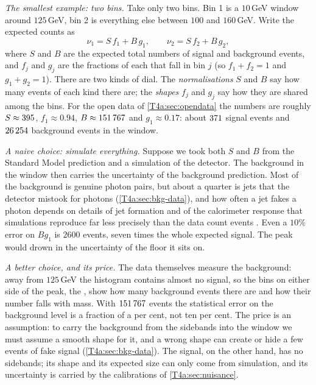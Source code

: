 \emph{The smallest example: two bins.} Take only two bins. Bin 1 is a $10$\,GeV window around $125$\,GeV, bin 2 is everything else between $100$ and $160$\,GeV. Write the expected counts as
\begin{equation}
  \nu_1=S\,f_1+B\,g_1,\qquad \nu_2=S\,f_2+B\,g_2,
  \label{T4a:eq:two-bin}
\end{equation}
where $S$ and $B$ are the expected total numbers of signal and background events, and $f_j$ and $g_j$ are the fractions of each that fall in bin $j$ (so $f_1+f_2=1$ and $g_1+g_2=1$). There are two kinds of dial. The \emph{normalisations} $S$ and $B$ say how many events of each kind there are; the \emph{shapes} $f_j$ and $g_j$ say how they are shared among the bins. For the open data of \cref{T4a:sec:opendata} the numbers are roughly $S\approx395$, $f_1\approx0.94$, $B\approx\num{151767}$ and $g_1\approx0.17$: about $\tfouraR{0}{\TfdSwin}$ signal events and $\num{26254}$ background events in the window.

\emph{A naive choice: simulate everything.} Suppose we took both $S$ and $B$ from the Standard Model prediction and a simulation of the detector. The background in the window then carries the uncertainty of the background prediction. Most of the background is genuine photon pairs, but about a quarter is jets that the detector mistook for photons (\cref{T4a:sec:bkg-data}), and how often a jet fakes a photon depends on details of jet formation and of the calorimeter response that simulations reproduce far less precisely than the data count events \cite[Sec.~4.2]{Cranmer2015}. Even a $10\%$ error on $B g_1$ is $\num{2600}$ events, seven times the whole expected signal. The peak would drown in the uncertainty of the floor it sits on.

\emph{A better choice, and its price.} The data themselves measure the background: away from $125$\,GeV the histogram contains almost no signal, so the bins on either side of the peak, the , show how many background events there are and how their number falls with mass. With $\num{151767}$ events the statistical error on the background level is a fraction of a per cent, not ten per cent. The price is an assumption: to carry the background from the sidebands into the window we must assume a smooth shape for it, and a wrong shape can create or hide a few events of fake signal (\cref{T4a:sec:bkg-data}). The signal, on the other hand, has no sidebands; its shape and its expected size can only come from simulation, and its uncertainty is carried by the calibrations of \cref{T4a:sec:nuisance}.

